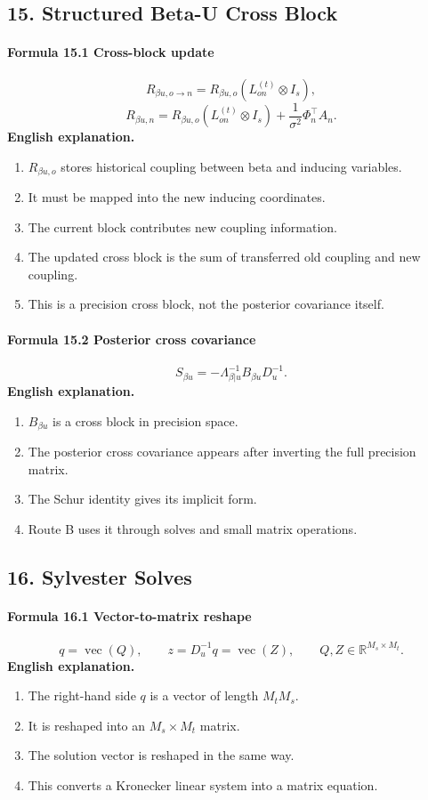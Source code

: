 \documentclass[12pt]{article}
\begin{document}
\subsection{15. Structured Beta-U Cross Block}
\paragraph{Formula 15.1 Cross-block update}
\[
R_{\beta u,o\rightarrow n}
=R_{\beta u,o}(L_{on}^{(t)}\otimes I_s),
\]
\[
R_{\beta u,n}
=
R_{\beta u,o}(L_{on}^{(t)}\otimes I_s)
+
\frac1{\sigma^2}\Phi_n^\top A_n.
\]
\textbf{English explanation.}
\begin{enumerate}[leftmargin=2em]
\item \(R_{\beta u,o}\) stores historical coupling between beta and inducing variables.
\item It must be mapped into the new inducing coordinates.
\item The current block contributes new coupling information.
\item The updated cross block is the sum of transferred old coupling and new coupling.
\item This is a precision cross block, not the posterior covariance itself.
\end{enumerate}

\paragraph{Formula 15.2 Posterior cross covariance}
\[
S_{\beta u}
=
-\Lambda_{\beta|u}^{-1}B_{\beta u}D_u^{-1}.
\]
\textbf{English explanation.}
\begin{enumerate}[leftmargin=2em]
\item \(B_{\beta u}\) is a cross block in precision space.
\item The posterior cross covariance appears after inverting the full precision matrix.
\item The Schur identity gives its implicit form.
\item Route B uses it through solves and small matrix operations.
\end{enumerate}

\subsection{16. Sylvester Solves}
\paragraph{Formula 16.1 Vector-to-matrix reshape}
\[
q=\operatorname{vec}(Q),
\qquad
z=D_u^{-1}q=\operatorname{vec}(Z),
\qquad
Q,Z\in\mathbb R^{M_s\times M_t}.
\]
\textbf{English explanation.}
\begin{enumerate}[leftmargin=2em]
\item The right-hand side \(q\) is a vector of length \(M_tM_s\).
\item It is reshaped into an \(M_s\times M_t\) matrix.
\item The solution vector is reshaped in the same way.
\item This converts a Kronecker linear system into a matrix equation.
\end{enumerate}
\end{document}
